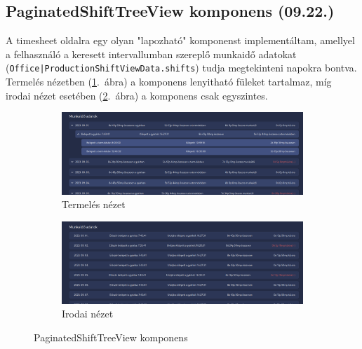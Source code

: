 \documentclass[a4paper]{article}
\newcommand{\inltxt}[1]{\texttt{#1}}
\begin{document}
\subsection{PaginatedShiftTreeView komponens (09.22.)}

A timesheet oldalra egy olyan "lapozható" komponenst implementáltam, amellyel a
felhasználó a keresett intervallumban szereplő munkaidő adatokat
(\inltxt{Office|ProductionShiftViewData.shifts}) tudja megtekinteni napokra bontva. Termelés
nézetben (\ref{fig:production_view}.~ábra) a komponens lenyitható füleket tartalmaz, míg irodai nézet esetében (\ref{fig:office_view}.~ábra) a komponens csak
egyszintes.

\begin{figure}[ht]
    \centering
    \begin{subfigure}[b]{0.8\textwidth}
        \centering
        \includegraphics[width=\textwidth]{images/production_view.png}
        \caption{Termelés nézet}
        \label{fig:production_view}
    \end{subfigure}

    \vspace{1em} %

    \begin{subfigure}[b]{0.8\textwidth}
        \centering
        \includegraphics[width=\textwidth]{images/office_view.png}
        \caption{Irodai nézet}
        \label{fig:office_view}
    \end{subfigure}

    \caption{PaginatedShiftTreeView komponens}
    \label{fig:paginated_shift_tree_view}
\end{figure}
\end{document}

